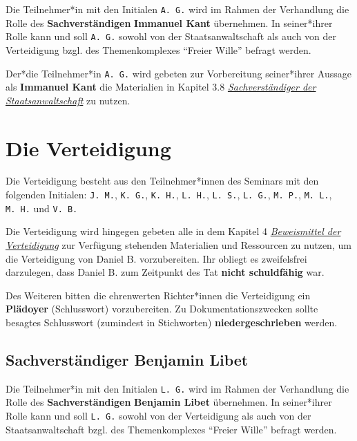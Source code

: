 \documentclass[
  a4paper,
]{report}
\begin{document}
Die Teilnehmer*in mit den Initialen \texttt{A.\ G.} wird im Rahmen der Verhandlung die Rolle des \textbf{Sachverständigen} \textbf{Immanuel Kant} übernehmen. In seiner*ihrer Rolle kann und soll \texttt{A.\ G.} sowohl von der Staatsanwaltschaft als auch von der Verteidigung bzgl. des Themenkomplexes ``Freier Wille'' befragt werden.

Der*die Teilnehmer*in \texttt{A.\ G.} wird gebeten zur Vorbereitung seiner*ihrer Aussage als \textbf{Immanuel Kant} die Materialien in Kapitel 3.8 \protect\hyperlink{pr-expert}{\emph{Sachverständiger der Staatsanwaltschaft}} zu nutzen.

\hypertarget{defence}{%
\section{Die Verteidigung}\label{defence}}

Die Verteidigung besteht aus den Teilnehmer*innen des Seminars mit den folgenden Initialen: \texttt{J.\ M.}, \texttt{K.\ G.}, \texttt{K.\ H.}, \texttt{L.\ H.}, \texttt{L.\ S.}, \texttt{L.\ G.}, \texttt{M.\ P.}, \texttt{M.\ L.}, \texttt{M.\ H.} und \texttt{V.\ B.}

Die Verteidigung wird hingegen gebeten alle in dem Kapitel 4 \protect\hyperlink{defence-evidence}{\emph{Beweismittel der Verteidigung}} zur Verfügung stehenden Materialien und Ressourcen zu nutzen, um die Verteidigung von Daniel B. vorzubereiten. Ihr obliegt es zweifelsfrei darzulegen, dass Daniel B. zum Zeitpunkt des Tat \textbf{nicht schuldfähig} war.

Des Weiteren bitten die ehrenwerten Richter*innen die Verteidigung ein \textbf{Plädoyer} (Schlusswort) vorzubereiten. Zu Dokumentationszwecken sollte besagtes Schlusswort (zumindest in Stichworten) \textbf{niedergeschrieben} werden.

\hypertarget{sachverstuxe4ndiger-benjamin-libet}{%
\subsection{Sachverständiger Benjamin Libet}\label{sachverstuxe4ndiger-benjamin-libet}}

Die Teilnehmer*in mit den Initialen \texttt{L.\ G.} wird im Rahmen der Verhandlung die Rolle des \textbf{Sachverständigen} \textbf{Benjamin Libet} übernehmen. In seiner*ihrer Rolle kann und soll \texttt{L.\ G.} sowohl von der Verteidigung als auch von der Staatsanwaltschaft bzgl. des Themenkomplexes ``Freier Wille'' befragt werden.
\end{document}
